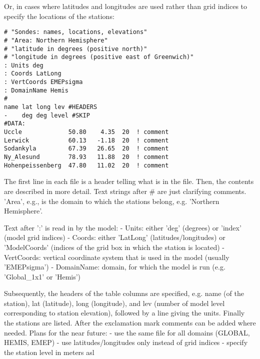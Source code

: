 Or, in cases where latitudes and longitudes are used rather than grid
indices to specify the locations of the stations:

\begin{small}
\begin{verbatim}
# "Sondes: names, locations, elevations"
# "Area: Northern Hemisphere"
# "latitude in degrees (positive north)"
# "longitude in degrees (positive east of Greenwich)"
: Units deg
: Coords LatLong
: VertCoords EMEPsigma
: DomainName Hemis
#
name lat long lev #HEADERS
-    deg deg level #SKIP
#DATA:
Uccle             50.80    4.35  20  ! comment
Lerwick           60.13   -1.18  20  ! comment
Sodankyla         67.39   26.65  20  ! comment
Ny_Alesund        78.93   11.88  20  ! comment
Hohenpeissenberg  47.80   11.02  20  ! comment
\end{verbatim}
\end{small}

The first line in each file is a header telling what is in the file.
Then, the contents are described in more detail. Text strings after
\# are just clarifying comments. 'Area', e.g., is the domain to which
the stations belong, e.g. 'Northern Hemisphere'.

Text after ':' is read in by the model:\newline
- Units: either 'deg' (degrees) or 'index' (model grid indices)\newline
- Coords: either 'LatLong' (latitudes/longitudes) or 'ModelCoords'
(indices of the grid box in which the station is located)\newline
- VertCoords: vertical coordinate system that is used in the model (usually
'EMEPsigma')\newline
- DomainName: domain, for which the model is run (e.g. 'Global\_1x1' or 'Hemis')\newline

Subsequently, the headers of the table columns are specified, e.g.
name (of the station), lat (latitude), long (longitude), and lev
(number of model level corresponding to station elevation),
followed by a line giving the units.
Finally the stations are listed. After the exclamation mark comments
can be added where needed.
\newline
\newline
Plans for the near future:\newline
- use the same file for all domains (GLOBAL, HEMIS, EMEP)\newline
- use latitudes/longitudes only instead of grid indices\newline
- specify the station level in meters asl\newline
\newline

